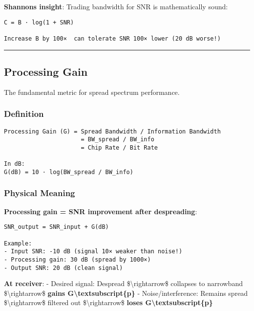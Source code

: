 \textbf{Shannon\textquotesingle s insight}: Trading bandwidth for SNR is
mathematically sound:

\begin{verbatim}
C = B · log(1 + SNR)

Increase B by 100×  can tolerate SNR 100× lower (20 dB worse!)
\end{verbatim}

\begin{center}\rule{0.5\linewidth}{0.5pt}\end{center}

\subsection{\texorpdfstring{ Processing
Gain}{ Processing Gain}}\label{processing-gain}

The fundamental metric for spread spectrum performance.

\subsubsection{Definition}\label{definition}

\begin{verbatim}
Processing Gain (G) = Spread Bandwidth / Information Bandwidth
                      = BW_spread / BW_info
                      = Chip Rate / Bit Rate

In dB:
G(dB) = 10 · log(BW_spread / BW_info)
\end{verbatim}

\subsubsection{Physical Meaning}\label{physical-meaning}

\textbf{Processing gain = SNR improvement after despreading}:

\begin{verbatim}
SNR_output = SNR_input + G(dB)

Example:
- Input SNR: -10 dB (signal 10× weaker than noise!)
- Processing gain: 30 dB (spread by 1000×)
- Output SNR: 20 dB (clean signal)
\end{verbatim}

\textbf{At receiver}: - Desired signal: Despread
\$\textbackslash rightarrow\$ collapses to narrowband
\$\textbackslash rightarrow\$ \textbf{gains
G\textbackslash textsubscript\{p\}} - Noise/interference: Remains spread
\$\textbackslash rightarrow\$ filtered out \$\textbackslash rightarrow\$
\textbf{loses G\textbackslash textsubscript\{p\}}

